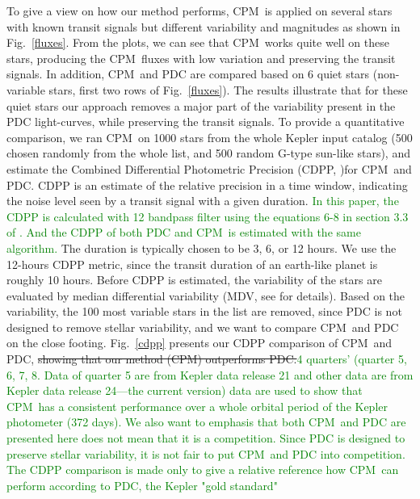 \documentclass[12pt, preprint]{aastex}
\newcommand{\name}{CPM}
\newcommand{\revise}[1]{\textcolor{green}{#1}}
\newcommand{\remove}[1]{\sout{#1}}
\begin{document}
To give a view on how our method performs, \name\ is applied on several stars with 
known transit signals but different variability and magnitudes as shown in Fig.~\ref{fluxes}. 
From the plots, we can see that \name\ works quite well on these stars, producing the \name\ fluxes 
with low variation and preserving the transit signals.
In addition, \name\ and PDC are compared based on 6 quiet stars 
(non-variable stars, first two rows of Fig.~\ref{fluxes}). 
The results illustrate that for these quiet stars our approach removes 
a major part of the variability present in the PDC light-curves, while preserving the transit signals. 
To provide a quantitative comparison, we ran \name\ on 1000 stars from the whole Kepler input catalog 
(500 chosen randomly from the whole list, and 500 random G-type sun-like stars), 
and estimate the Combined Differential Photometric Precision (CDPP,  \cite{cdpp1} )for \name\ and PDC.  
CDPP is an estimate of the relative precision in a time window, 
indicating the noise level seen by a transit signal with a given duration. 
\revise{In this paper, the CDPP is calculated with 12 bandpass filter using the equations 6-8 in section 3.3 of \citep{cdpp1}. And the CDPP of both PDC and \name\ is estimated with the same algorithm.} 
The duration is typically chosen to be 3, 6, or 12 hours. 
We use the 12-hours CDPP metric, since the transit duration of an earth-like planet is roughly 10 hours. 
Before CDPP is estimated, the variability of the stars are evaluated by median differential variability 
  (MDV, see \cite{basri2013} for details). 
Based on the variability, the 100 most variable stars in the list are removed, 
  since PDC is not designed to remove stellar variability, 
  and we want to compare \name\ and PDC on the close footing.
Fig.~\ref{cdpp} presents our CDPP comparison of \name\ and PDC, 
  \remove{showing that our method (\name) outperforms PDC.}\revise{4 quarters' (quarter 5, 6, 7, 8. Data of quarter 5 are from Kepler data release 21 and other data are from Kepler data release 24---the current version) data are used to show that \name\ has a consistent performance over a whole orbital period of the Kepler photometer (372 days). We also want to emphasis that both \name\ and PDC are presented here does not mean that it is a competition. Since PDC is designed to preserve stellar variability, it is not fair to put \name\ and PDC into competition. The CDPP comparison is made only to give a relative reference how \name\ can perform according to PDC, the Kepler "gold standard"}
\end{document}
